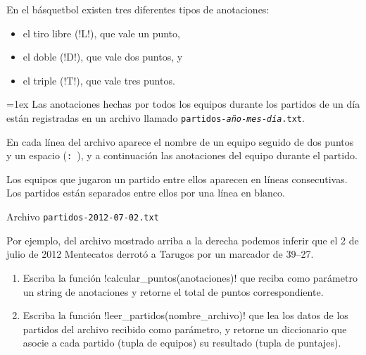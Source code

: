 En el básquetbol existen tres diferentes tipos de anotaciones:
\begin{itemize}
  \item el tiro libre (\li!L!), que vale un punto,
  \item el doble (\li!D!), que vale dos puntos, y
  \item el triple (\li!T!), que vale tres puntos.
\end{itemize}

\begin{minipage}[t]{0.52\textwidth}
  \parskip=1ex
  Las anotaciones hechas por todos los equipos
  durante los partidos de un día
  están registradas en un archivo
  llamado \texttt{partidos-\textit{año}-\textit{mes}-\textit{día}.txt}.

  En cada línea del archivo aparece el nombre de un equipo
  seguido de dos puntos y un espacio (\verb+: +),
  y a continuación las anotaciones del equipo durante el partido.

  Los equipos que jugaron un partido entre ellos
  aparecen en líneas consecutivas.
  Los partidos están separados entre ellos
  por una línea en blanco.

\end{minipage}
\hfill
\begin{minipage}[t]{0.43\textwidth}
  \centering
  Archivo \verb+partidos-2012-07-02.txt+
  \small
  
\end{minipage}

Por ejemplo,
del archivo mostrado arriba a la derecha
podemos inferir que el 2 de julio de 2012
Mentecatos derrotó a Tarugos por un marcador de 39--27.

\begin{enumerate}[leftmargin=0pt,label=\emph{\alph*})]

  \item
    Escriba la función \li!calcular_puntos(anotaciones)!
    que reciba como parámetro un string de anotaciones
    y retorne el total de puntos correspondiente.
    

  \item
    Escriba la función \li!leer_partidos(nombre_archivo)!
    que lea los datos de los partidos del archivo recibido como parámetro,
    y retorne un diccionario
    que asocie a cada partido (tupla de equipos)
    su resultado (tupla de puntajes).
    

\end{enumerate}

